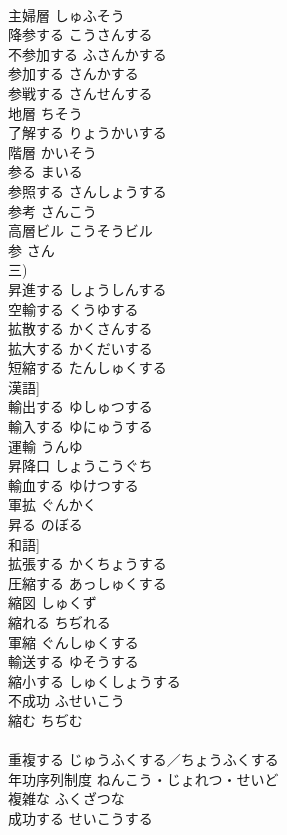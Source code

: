 \documentclass[8pt]{extreport}
\begin{document}
\begin{CJK}{UTF8}{min}
\\	主婦層	しゅふそう	
\\	降参する	こうさんする	
\\	不参加する	ふさんかする	
\\	参加する	さんかする	
\\	参戦する	さんせんする	
\\	地層	ちそう	
\\	了解する	りょうかいする	
\\	階層	かいそう	
\\	参る	まいる	
\\	参照する	さんしょうする	
\\	参考	さんこう	
\\	高層ビル	こうそうビル	
\\	参	さん	
\\	三)
\\	昇進する	しょうしんする	
\\	空輸する	くうゆする	
\\	拡散する	かくさんする	
\\	拡大する	かくだいする	
\\	短縮する	たんしゅくする	
\\	漢語]
\\	輸出する	ゆしゅつする	
\\	輸入する	ゆにゅうする	
\\	運輸	うんゆ	
\\	昇降口	しょうこうぐち	
\\	輸血する	ゆけつする	
\\	軍拡	ぐんかく	
\\	昇る	のぼる	
\\	和語]
\\	拡張する	かくちょうする	
\\	圧縮する	あっしゅくする	
\\	縮図	しゅくず	
\\	縮れる	ちぢれる	
\\	軍縮	ぐんしゅくする	
\\	輸送する	ゆそうする	
\\	縮小する	しゅくしょうする	
\\	不成功	ふせいこう	
\\	縮む	ちぢむ	
\\	[和語]
\\	重複する	じゅうふくする／ちょうふくする	
\\	年功序列制度	ねんこう・じょれつ・せいど	
\\	複雑な	ふくざつな	
\\	成功する	せいこうする	

\end{CJK}
\end{document}
